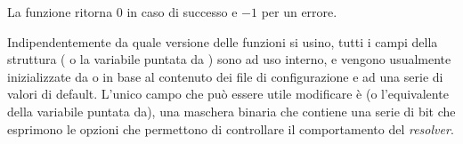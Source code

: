\begin{funcproto}{
}
{La funzione ritorna $0$ in caso di successo e $-1$ per un errore.
}
\end{funcproto}

Indipendentemente da quale versione delle funzioni si usino, tutti i campi
della struttura ( o la variabile puntata da ) sono ad
uso interno, e vengono usualmente inizializzate da  o
 in base al contenuto dei file di configurazione e ad una
serie di valori di default. L'unico campo che può essere utile modificare è
 (o l'equivalente della variabile puntata
da), una maschera binaria che contiene una serie di bit che
esprimono le opzioni che permettono di controllare il comportamento del
\textit{resolver}.

